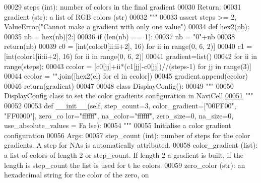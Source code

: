 \begin{DoxyCode}
00029 \textcolor{stringliteral}{        steps (int): number of colors in the final gradient}
00030 \textcolor{stringliteral}{    Return:}
00031 \textcolor{stringliteral}{        gradient (str): a list of RGB colors (str)}
00032 \textcolor{stringliteral}{    """}
00033     \textcolor{keyword}{assert} steps >= 2, ValueError(\textcolor{stringliteral}{"Cannot make a gradient with only one value"})
00034     \textcolor{keyword}{def }hex2(nb):
00035         nb = hex(nb)[2:]
00036         \textcolor{keywordflow}{if} (len(nb) == 1):
00037             nb = \textcolor{stringliteral}{"0"}+nb
00038         \textcolor{keywordflow}{return}(nb)
00039     c0 = [int(color0[ii:ii+2], 16) \textcolor{keywordflow}{for} ii \textcolor{keywordflow}{in} range(0, 6, 2)]
00040     c1 = [int(color1[ii:ii+2], 16) \textcolor{keywordflow}{for} ii \textcolor{keywordflow}{in} range(0, 6, 2)]
00041     gradient=list()
00042     \textcolor{keywordflow}{for} ii \textcolor{keywordflow}{in} range(steps):
00043         ccolor = [c0[jj]+ii*(c1[jj]-c0[jj])//(steps-1) \textcolor{keywordflow}{for} jj \textcolor{keywordflow}{in} range(3)]
00044         ccolor = \textcolor{stringliteral}{""}.join([hex2(el) \textcolor{keywordflow}{for} el \textcolor{keywordflow}{in} ccolor])
00045         gradient.append(ccolor)
00046     \textcolor{keywordflow}{return}(gradient)
00047 
00048 \textcolor{keyword}{class }DisplayConfig():
00049     \textcolor{stringliteral}{"""}
00050 \textcolor{stringliteral}{    DisplayConfig class to set the color gradients configuration in NaviCell}
\hypertarget{displayConfig_8py_source_l00051}{}\hyperlink{classnavicom_1_1displayConfig_1_1DisplayConfig}{00051} \textcolor{stringliteral}{    """}
00052 
00053     \textcolor{keyword}{def }\hyperlink{classnavicom_1_1displayConfig_1_1DisplayConfig_a26387ee9e6fe63612bc87a4d5d4a17f2}{__init__}(self, step\_count=3, color\_gradient=["00FF00", "FF0000"], zero\_co
      lor="ffffff", na\_color="ffffff", zero\_size=0, na\_size=0, use\_absolute\_values = Fa
      lse):
00054         \textcolor{stringliteral}{"""}
00055 \textcolor{stringliteral}{        Initialise a color gradient configuration}
00056 \textcolor{stringliteral}{        Args:}
00057 \textcolor{stringliteral}{            step\_count (int): number of steps for the color gradients. A step for
       NAs is automatically attributed.}
00058 \textcolor{stringliteral}{            color\_gradient (list): a list of colors of length 2 or step\_count. If
       length 2 a gradient is built, if the length is step\_count the list is used for t
      he colors.}
00059 \textcolor{stringliteral}{            zero\_color (str): an hexadecimal string for the color of the zero, on
}
\end{DoxyCode}
